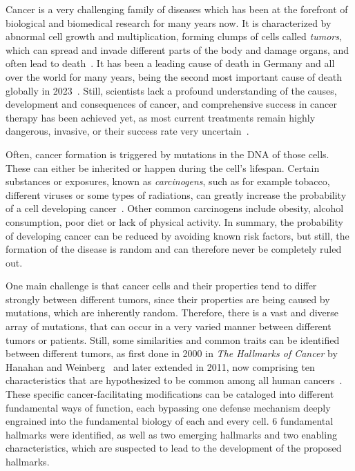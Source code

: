 Cancer is a very challenging family of diseases which has been at the forefront of biological and biomedical research for many years now. It is characterized by abnormal cell growth and multiplication, forming clumps of cells called \textit{tumors}, which can spread and invade different parts of the body and damage organs, and often lead to death~\cite{who-cancer}. It has been a leading cause of death \color{Gray}in Germany and \color{Black}all over the world for many years, being the second most important cause of death globally in 2023~\cite{owid-causes-of-death}. Still, scientists lack a profound understanding of the causes, development and consequences of cancer, and comprehensive success in cancer therapy has been achieved yet, as most current treatments remain highly dangerous, invasive, or their success rate very uncertain~\cite{side-effects-cancer-treatments, narrative-review-heterogeneity-challenges}.

Often, cancer formation is triggered by mutations in the DNA of those cells. These can either be inherited or happen during the cell's lifespan. Certain substances or exposures, known as \textit{carcinogens}, such as for example tobacco, different viruses or some types of radiations, can greatly increase the probability of a cell developing cancer~\cite{carcinogens}. Other common carcinogens include obesity, alcohol consumption, poor diet or lack of physical activity. In summary, the probability of developing cancer can be reduced by avoiding known risk factors, but still, the formation of the disease is random and can therefore never be completely ruled out.

One main challenge is that cancer cells and their properties tend to differ strongly between different tumors, since their properties are being caused by mutations, which are inherently random. Therefore, there is a vast and diverse array of mutations, that can occur in a very varied manner between different tumors or patients. Still, some similarities and common traits can be identified between different tumors, as first done in 2000 in \textit{The Hallmarks of Cancer} by Hanahan and Weinberg~\cite{hallmarks-of-cancer} and later extended in 2011, now comprising ten characteristics that are hypothesized to be common among all human cancers~\cite{hallmarks-of-cancer-next-generation}.\\
These specific cancer-facilitating modifications can be cataloged into different fundamental ways of function, each bypassing one defense mechanism deeply engrained into the fundamental biology of each and every cell. 6 fundamental hallmarks were identified, as well as two emerging hallmarks and two enabling characteristics, which are suspected to lead to the development of the proposed hallmarks.

